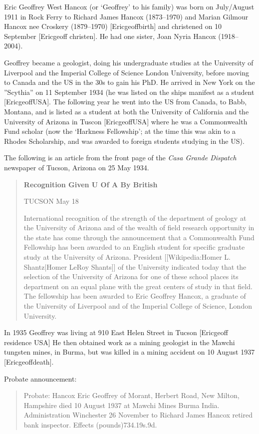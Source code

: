 
Eric Geoffrey West Hancox (or `Geoffrey' to his family) was  born on July/August 1911 in Rock Ferry to Richard James Hancox (1873--1970) and Marian Gilmour Hancox nee Croskery (1879--1970) [Ericgeoffbirth] and christened on 10 September [Ericgeoff christen].  He had one sister, Joan Nyria Hancox (1918--2004).  

Geoffrey became a geologist, doing his undergraduate studies at the University of Liverpool and the Imperial College of Science London University, before moving to Canada and the US in the 30s to gain his PhD. 
He arrived in New York on the ''Scythia'' on 11 September 1934 (he was listed on the ships manifest as a student [EricgeoffUSA]. The following year he went into the US from Canada, to Babb, Montana, and is listed as a student at both the University of California and the University of Arizona in Tuscon [EricgeoffUSA] where he was a Commonwealth Fund scholar (now the `Harkness Fellowship'; at the time this was akin to a Rhodes Scholarship, and was awarded to foreign students studying in the US).

The following is an article from the front page of the \emph{Casa Grande Dispatch} newspaper of Tucson, Arizona on 25 May 1934.\cite{CasaP1}

\begin{quotation}
\textbf{Recognition Given U Of A By British}

TUCSON May 18

International recognition of the strength of the department of geology at the University of Arizona and of the wealth of field research opportunity in the state has come through the announcement that a Commonwealth Fund Fellowship has been awarded to an English student for specific graduate study at the University of Arizona. President [[Wikipedia:Homer L. Shantz|Homer LeRoy Shants]] of the University indicated today that the selection of the University of Arizona for one of these school places its department on an equal plane with the great centers of study in that field. The fellowship has been awarded to Eric Geoffrey Hancox, a graduate of the University of Liverpool and of the Imperial College of Science, London University.
\end{quotation}

In 1935 Geoffrey was living at 910 East Helen Street in Tucson [Ericgeoff residence USA]
He then obtained work as a mining geologist in  the Mawchi tungsten mines, in Burma, but was killed in a mining accident on 10 August 1937 [Ericgeoffdeath].



Probate announcement:
\begin{quotation}
Probate: Hancox Eric Geoffrey of Morant, Herbert Road, New Milton, Hampshire died 10 August 1937 at Mawchi Mines Burma India. Administration Winchester 26 November to Richard James Hancox retired bank inspector. Effects (pounds)734.19s.9d.
\end{quotation}
